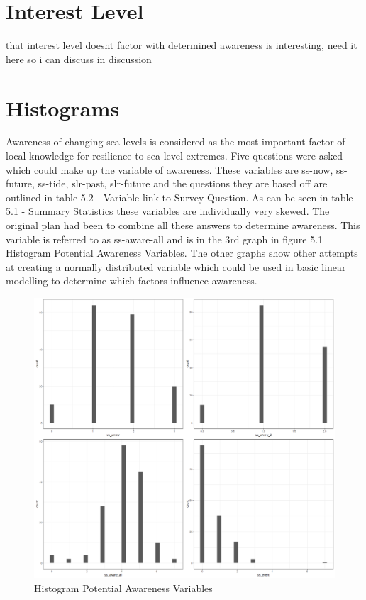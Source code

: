 \section{Interest Level}
that interest level doesnt factor with determined awareness is interesting, need it here so i can discuss in discussion 

\section{Histograms}
Awareness of changing sea levels is considered as the most important factor of local knowledge for resilience to sea level extremes. Five questions were asked which could make up the variable of awareness. These variables are ss-now, ss-future, ss-tide, slr-past, slr-future and the questions they are based off are outlined in table 5.2 - Variable link to Survey Question. As can be seen in table 5.1 - Summary Statistics these variables are individually very skewed. The original plan had been to combine all these answers to determine awareness. This variable is referred to as ss-aware-all and is in the 3rd graph in figure 5.1 Histogram Potential Awareness Variables. The other graphs show other attempts at creating a normally distributed variable which could be used in basic linear modelling to determine which factors influence awareness.

\begin{figure}[h]
    \centering
    \includegraphics[width=1\textwidth]{fig_results/Awareness.png}
    \caption{Histogram Potential Awareness Variables}
    \label{fig:aware}
\end{figure}

